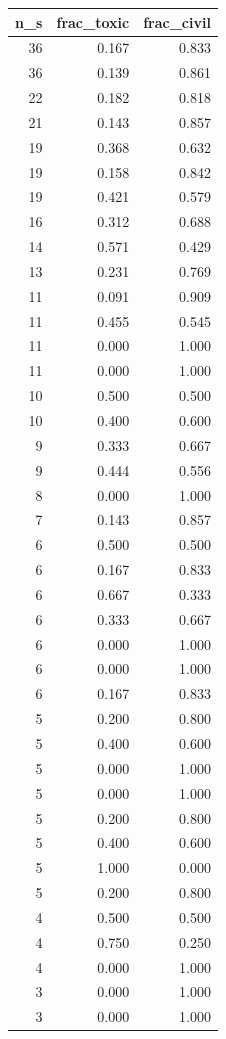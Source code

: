 \begin{tabular}{rrr}
\toprule
n_s & frac_toxic & frac_civil \\
\midrule
36 & 0.167 & 0.833 \\
36 & 0.139 & 0.861 \\
22 & 0.182 & 0.818 \\
21 & 0.143 & 0.857 \\
19 & 0.368 & 0.632 \\
19 & 0.158 & 0.842 \\
19 & 0.421 & 0.579 \\
16 & 0.312 & 0.688 \\
14 & 0.571 & 0.429 \\
13 & 0.231 & 0.769 \\
11 & 0.091 & 0.909 \\
11 & 0.455 & 0.545 \\
11 & 0.000 & 1.000 \\
11 & 0.000 & 1.000 \\
10 & 0.500 & 0.500 \\
10 & 0.400 & 0.600 \\
9 & 0.333 & 0.667 \\
9 & 0.444 & 0.556 \\
8 & 0.000 & 1.000 \\
7 & 0.143 & 0.857 \\
6 & 0.500 & 0.500 \\
6 & 0.167 & 0.833 \\
6 & 0.667 & 0.333 \\
6 & 0.333 & 0.667 \\
6 & 0.000 & 1.000 \\
6 & 0.000 & 1.000 \\
6 & 0.167 & 0.833 \\
5 & 0.200 & 0.800 \\
5 & 0.400 & 0.600 \\
5 & 0.000 & 1.000 \\
5 & 0.000 & 1.000 \\
5 & 0.200 & 0.800 \\
5 & 0.400 & 0.600 \\
5 & 1.000 & 0.000 \\
5 & 0.200 & 0.800 \\
4 & 0.500 & 0.500 \\
4 & 0.750 & 0.250 \\
4 & 0.000 & 1.000 \\
3 & 0.000 & 1.000 \\
3 & 0.000 & 1.000 \\

\end{tabular}
